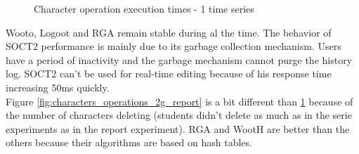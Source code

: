\begin{figure}[h]
\begin{minipage}{.50\linewidth}
  \caption{Character operation execution times - 1 time
series}
  \label{fig:characters_operations_1t_big}
\end{minipage} \hfill
\end{figure}

Wooto, Logoot and RGA remain stable during al the time. The behavior of SOCT2 performance is mainly due to its garbage collection mechanism. Users have a period of inactivity and the garbage mechanism cannot purge the history log. SOCT2 can't be used for real-time editing because of his response time increasing 50ms quickly.\\

Figure \ref{fig:characters_operations_2g_report} is a bit different than \ref{fig:characters_operations_1t_big} because of the number of characters deleting (students didn't delete as much as in the serie experiments as in the report experiment). RGA and WootH are better than the others because their algorithms are based on hash tables.\\


